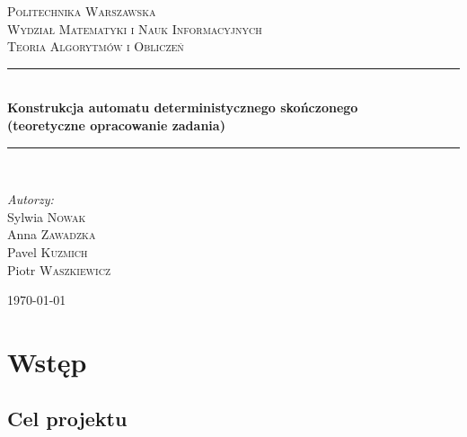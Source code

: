 \documentclass{llncs}
\begin{document}
	
\begin{titlepage}

\newcommand{\HRule}{\rule{\linewidth}{0.5mm}}

\center


\textsc{\LARGE Politechnika Warszawska}\\[5mm]
\textsc{\LARGE Wydział Matematyki i Nauk Informacyjnych}\\[4cm]
 

\textsc{\Large Teoria Algorytmów i Obliczeń}\\[0.5cm]


\HRule \\[0.4cm]
{ \huge \bfseries Konstrukcja automatu deterministycznego skończonego\\(teoretyczne opracowanie zadania)}\\[0.4cm]
\HRule \\[1.5cm]
 

\begin{flushright}
\Large \emph{Autorzy:}\\[0.5cm]
Sylwia \textsc{Nowak}\\
Anna \textsc{Zawadzka}\\
Pavel \textsc{Kuzmich}\\
Piotr \textsc{Waszkiewicz}\\
\end{flushright}


\vfill
{\large \today}\\[3cm]

\end{titlepage}
	
\tableofcontents
\newpage

\section{Wstęp}

\subsection{Cel projektu}
\end{document}
